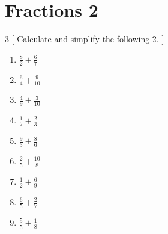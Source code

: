 \documentclass[fleqn]{article}
\begin{document}
\section{Fractions 2}
\begin{multicols}{3}
[
Calculate and simplify the following 2.
]
\begin{enumerate}[label=(\alph*)]
\item $ \displaystyle \frac{8}{2} + \frac{6}{7} $
\item $ \displaystyle \frac{6}{4} + \frac{9}{10} $
\item $ \displaystyle \frac{4}{9} + \frac{3}{10} $
\item $ \displaystyle \frac{1}{7} + \frac{2}{3} $
\item $ \displaystyle \frac{9}{3} + \frac{8}{6} $
\item $ \displaystyle \frac{2}{5} + \frac{10}{8} $
\item $ \displaystyle \frac{1}{2} + \frac{6}{9} $
\item $ \displaystyle \frac{6}{5} + \frac{2}{7} $
\item $ \displaystyle \frac{5}{5} + \frac{1}{8} $

\end{enumerate}
\end{multicols}
\end{document}
